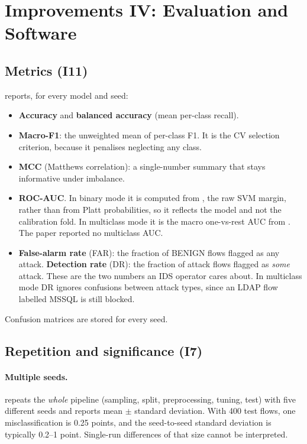 \section{Improvements IV: Evaluation and Software}
\label{sec:evalsw}

\subsection{Metrics (I11)}
 reports, for every model and seed:
\begin{itemize}
\item \textbf{Accuracy} and \textbf{balanced accuracy} (mean per-class recall).
\item \textbf{Macro-F1}: the unweighted mean of per-class F1. It is the CV selection criterion,
      because it penalises neglecting any class.
\item \textbf{MCC} (Matthews correlation): a single-number summary that stays informative under
      imbalance.
\item \textbf{ROC-AUC}. In binary mode it is computed from , the raw SVM
      margin, rather than from Platt probabilities, so it reflects the model and not the
      calibration fold. In multiclass mode it is the macro one-vs-rest AUC from .
      The paper reported no multiclass AUC.
\item \textbf{False-alarm rate} (FAR): the fraction of BENIGN flows flagged as any attack.
      \textbf{Detection rate} (DR): the fraction of attack flows flagged as \emph{some} attack. These
      are the two numbers an IDS operator cares about. In multiclass mode DR ignores confusions
      between attack types, since an LDAP flow labelled MSSQL is still blocked.
\end{itemize}
Confusion matrices are stored for every seed.

\subsection{Repetition and significance (I7)}
\paragraph{Multiple seeds.}  repeats the \emph{whole} pipeline (sampling,
split, preprocessing, tuning, test) with five different seeds and reports mean $\pm$ standard
deviation. With 400 test flows, one misclassification is 0.25 points, and the seed-to-seed
standard deviation is typically 0.2--1 point. Single-run differences of that size cannot be
interpreted.

